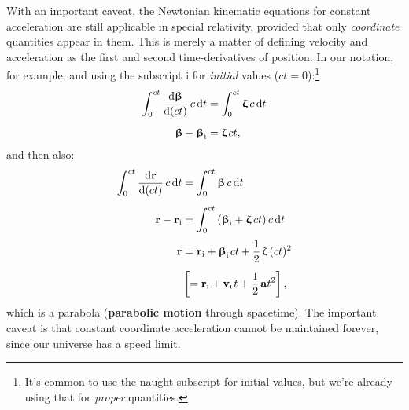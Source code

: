 \documentclass[12pt]{article}
\renewcommand{\vv}[1]{\mathbf{#1}}
\newcommand{\dd}[1]{\mathrm{d}#1}
\newcommand{\vvbeta}{\bm{\upbeta}}
\newcommand{\vvzeta}{\bm{\upzeta}}
\begin{document}
With an important caveat, the Newtonian kinematic equations for constant acceleration are still applicable in special relativity, provided that only \emph{coordinate} quantities appear in them. This is merely a matter of defining velocity and acceleration as the first and second time-derivatives of position. In our notation, for example, and using the subscript i for \emph{initial} values ($ct = 0$):\footnote{It's common to use the naught subscript for initial values, but we're already using that for \emph{proper} quantities.}
\begin{equation*}
\begin{aligned}
\int_0^{ct} \dfrac{\dd \vvbeta}{\dd (ct)} \, c \, \dd t &= \int_0^{ct} \vvzeta \, c \, \dd t \\[5pt]
\vvbeta -  \vvbeta_{\textrm{i}} &= \vvzeta \mkern2mu ct,
\end{aligned}
\end{equation*}
and then also:
\begin{equation*}
\begin{aligned}
\int_0^{ct} \dfrac{\dd \vv r}{\dd (ct)} \, c \, \dd t &= \int_0^{ct} \vvbeta \, c \, \dd t \\[5pt]
\vv r - \vv r_{\textrm{i}} &= \int_0^{ct} \left( \vvbeta_{\textrm{i}} + \vvzeta \, ct \right) c \, \dd t \\[3pt]
\vv r &= \vv r_{\textrm{i}} + \vvbeta_{\textrm{i}} \mkern2mu ct + \dfrac{1}{2} \mkern2mu \vvzeta \, ( ct )^2 \\[4pt]
& \left[ = \vv r_{\textrm{i}} + \vv v_{\textrm{i}} \mkern2mu t + \dfrac{1}{2} \mkern2mu \vv a t^2 \right] ,
\end{aligned}
\end{equation*}
which is a parabola (\textbf{parabolic motion} through spacetime). The important caveat is that constant coordinate acceleration cannot be maintained forever, since our universe has a speed limit.
\end{document}
